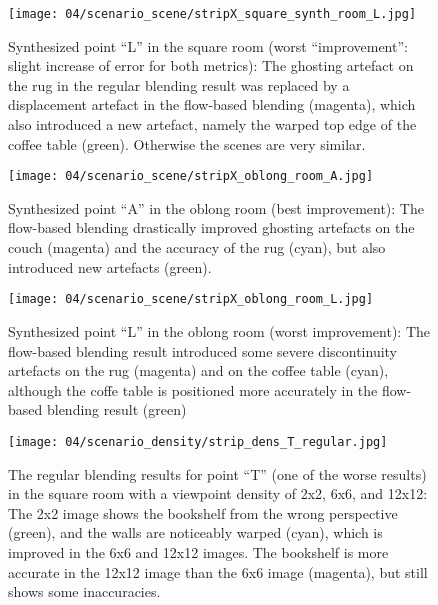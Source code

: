 \begin{figure}
  \centering
  \texttt{[image: 04/scenario\_scene/stripX\_square\_synth\_room\_L.jpg]}
  \caption[Viewpoint ``L'' in the square room]{Synthesized point ``L'' in the square room (worst ``improvement'': slight increase of error for both metrics): The ghosting artefact on the rug in the regular blending result was replaced by a displacement artefact in the flow-based blending (magenta), which also introduced a new artefact, namely the warped top edge of the coffee table (green). Otherwise the scenes are very similar.}
  \label{fig:scene_square_L}
\end{figure}

\begin{figure}
  \centering
  \texttt{[image: 04/scenario\_scene/stripX\_oblong\_room\_A.jpg]}
  \caption[Viewpoint ``A'' in the oblong room]{Synthesized point ``A'' in the oblong room (best improvement): The flow-based blending drastically improved ghosting artefacts on the couch (magenta) and the accuracy of the rug (cyan), but also introduced new artefacts (green).}
  \label{fig:scene_oblong_A}
\end{figure}

\begin{figure}
  \centering
  \texttt{[image: 04/scenario\_scene/stripX\_oblong\_room\_L.jpg]}
  \caption[Viewpoint ``L'' in the oblong room]{Synthesized point ``L'' in the oblong room (worst improvement): The flow-based blending result introduced some severe discontinuity artefacts on the rug (magenta) and on the coffee table (cyan), although the coffe table is positioned more accurately in the flow-based blending result (green)}
  \label{fig:scene_oblong_L}
\end{figure}


\begin{figure}
		\centering
    \texttt{[image: 04/scenario\_density/strip\_dens\_T\_regular.jpg]}
		\caption[Regular blending results for viewpoint ``T'' with different densities]{The regular blending results for point ``T'' (one of the worse results) in the square room with a viewpoint density of 2x2, 6x6, and 12x12: The 2x2 image shows the bookshelf from the wrong perspective (green), and the walls are noticeably warped (cyan), which is improved in the 6x6 and 12x12 images. The bookshelf is more accurate in the 12x12 image than the 6x6 image (magenta), but still shows some inaccuracies.}
		\label{fig:density_regular_T}
\end{figure}

